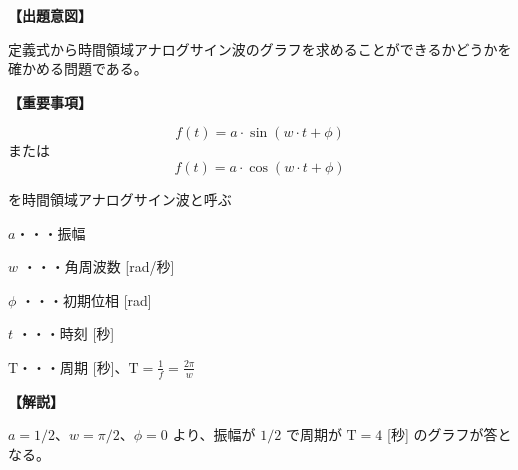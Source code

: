 \noindent \textbf{【出題意図】}

\noindent 定義式から時間領域アナログサイン波のグラフを求めることができるかどうかを確かめる問題である。

\vspace{1em}
\noindent \textbf{【重要事項】}

\[
f(t) = a \cdot \sin( w \cdot t + \phi )
\]
%
\noindent または
%
\[
f(t) = a \cdot \cos( w \cdot t + \phi )
\]

\medskip
\noindent を時間領域アナログサイン波と呼ぶ

\bigskip
\noindent $a$・・・振幅

\bigskip
\noindent $w$ ・・・角周波数 [rad/秒]

\bigskip
\noindent $\phi$ ・・・初期位相 [rad]

\bigskip
\noindent $t$ ・・・時刻 [秒]

\bigskip
$\textrm{T}$・・・周期 [秒]、$\textrm{T} = \frac{1}{f} = \frac{2\pi}{w}$

\vspace{1em}
\noindent \textbf{【解説】}

\noindent $a = 1/2$、$w = \pi/2$、$\phi = 0$ より、振幅が $1/2$ で周期が $\textrm{T} = 4$ [秒] のグラフが答となる。
